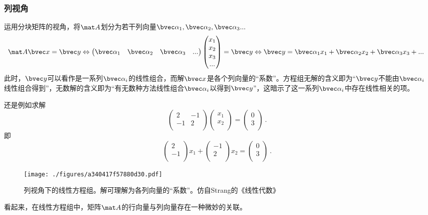 \subsubsection{列视角}
运用分块矩阵的视角，将$\mat A$划分为若干列向量$\bvec \alpha_1, \bvec \alpha_2,\bvec \alpha_3...$
$$
\mat A \bvec x=\bvec y \Leftrightarrow 
\begin{pmatrix}
\bvec \alpha_1& \bvec \alpha_2& \bvec \alpha_3&...
\end{pmatrix}
\begin{pmatrix}
x_{1}\\
x_{2}\\
x_{3}\\
...\\
\end{pmatrix}
=
\bvec y
\Leftrightarrow 
\bvec y = \bvec \alpha_1 x_1+\bvec \alpha_2 x_2+\bvec \alpha_3 x_3+...~
$$
此时，$\bvec y$可以看作是一系列$\bvec \alpha_i$的线性组合，而解$\bvec x$是各个列向量的“系数”。方程组无解的含义即为“$\bvec y$不能由$\bvec \alpha_i$线性组合得到”，无数解的含义即为“有无数种方法线性组合$\bvec \alpha_i$以得到$\bvec y$”，这暗示了这一系列$\bvec \alpha_i$中存在线性相关的项。

\begin{example}{}
还是例如求解
$$
\begin{pmatrix}
2&-1\\
-1&2\\
\end{pmatrix}
\begin{pmatrix}
x_1\\
x_2\\
\end{pmatrix}
=
\begin{pmatrix}
0\\
3\\
\end{pmatrix}~.
$$
即
$$
\begin{pmatrix}
2\\
-1\\
\end{pmatrix}
x_1
+
\begin{pmatrix}
-1\\
2\\
\end{pmatrix}
x_2
=
\begin{pmatrix}
0\\
3\\
\end{pmatrix}~.
$$
\begin{figure}[ht]
\centering
\texttt{[image: ./figures/a340417f57880d30.pdf]}
\caption{列视角下的线性方程组。解可理解为各列向量的“系数”。仿自Strang的《线性代数》} \label{fig_LinEq_4}
\end{figure}
\end{example}
看起来，在线性方程组中，矩阵$\mat A$的行向量与列向量存在一种微妙的关联。

